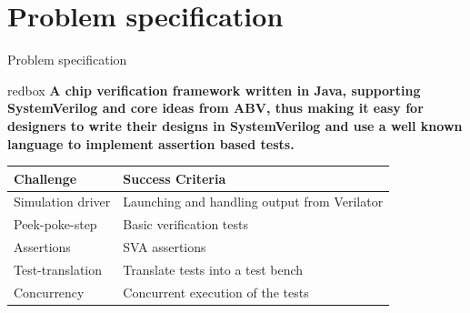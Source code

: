 \documentclass[aspectratio=169, handout]{beamer}
\begin{document}
\section{Problem specification}
\begin{frame}{Problem specification}
    \begin{center}
        \begin{beamercolorbox}[sep=2em]{redbox}
            \textbf{A chip verification framework written in Java, supporting SystemVerilog and core ideas from ABV, thus making it easy for designers to write their designs in SystemVerilog and use a well known language to implement assertion based tests.}
        \end{beamercolorbox}
        \begin{tabular}{ll}
            \toprule
            Challenge         & Success Criteria                             \\
            \midrule
            Simulation driver & Launching and handling output from Verilator \\
            Peek-poke-step    & Basic verification tests                     \\
            Assertions        & SVA assertions                               \\
            Test-translation  & Translate tests into a test bench            \\
            Concurrency       & Concurrent execution of the tests            \\
            \bottomrule
        \end{tabular}
    \end{center}
\end{frame}
\end{document}

